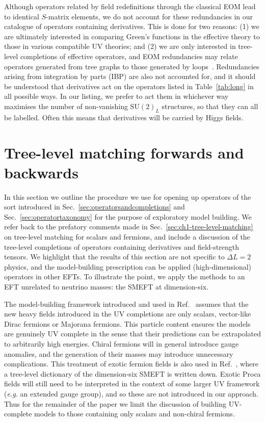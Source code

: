 Although operators related by field redefinitions through the classical EOM lead
to identical $S$-matrix elements, we do not account for these redundancies in
our catalogue of operators containing derivatives. This is done for two reasons:
(1) we are ultimately interested in comparing Green's functions in the effective
theory to those in various compatible UV theories; and (2) we are only
interested in tree-level completions of effective operators, and EOM
redundancies may relate operators generated from tree graphs to those generated
by loops~\cite{Arzt:1994gp, Einhorn:2013kja}. Redundancies arising from
integration by parts (IBP) are also not accounted for, and it should be
understood that derivatives act on the operators listed in Table~\ref{tab:long}
in all possible ways. In our listing, we prefer to act them in whichever way
maximises the number of non-vanishing $\mathrm{SU}(2)_{L}$ structures, so that
they can all be labelled. Often this means that derivatives will be carried by
Higgs fields.

\section{Tree-level matching forwards and backwards}
\label{sec:treelevelmatching}

In this section we outline the procedure we use for opening up operators of the
sort introduced in Sec.~\ref{sec:operatorsandcompletions} and
Sec.~\ref{sec:operatortaxonomy} for the purpose of exploratory model building.
We refer back to the prefatory comments made in
Sec.~\ref{sec:ch1-tree-level-matching} on tree-level matching for scalars and
fermions, and include a discussion of the tree-level completions of operators
containing derivatives and field-strength tensors. We highlight that the results
of this section are not specific to $\Delta L = 2$ physics, and the
model-building prescription can be applied (high-dimensional) operators in other
EFTs. To illustrate the point, we apply the methods to an EFT unrelated to
neutrino masses: the SMEFT at dimension-six.

The model-building framework introduced and used in Ref.~\cite{Angel:2012ug}
assumes that the new heavy fields introduced in the UV completions are only
scalars, vector-like Dirac fermions or Majorana fermions. This particle content
ensures the models are genuinely UV complete in the sense that their predictions
can be extrapolated to arbitrarily high energies. Chiral fermions will in
general introduce gauge anomalies, and the generation of their masses may
introduce unnecessary complications. This treatment of exotic fermion fields is
also used in Ref.~\cite{deBlas:2017xtg}, where a tree-level dictionary of the
dimension-six SMEFT is written down. Exotic Proca fields will still need to be
interpreted in the context of some larger UV framework (\textit{e.g.} an
extended gauge group), and so these are not introduced in our approach. Thus for
the remainder of the paper we limit the discussion of building UV-complete
models to those containing only scalars and non-chiral fermions.

